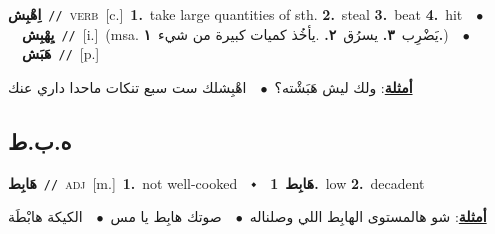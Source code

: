 \documentclass[10pt,a4paper,twoside]{article} %
\begin{document}
\begin{multicols}{2}
{{{{\setlength\topsep{0pt}\textbf{\foreignlanguage{arabic}{اِهْبِش}}\ {\color{gray}\texttt{//}\color{black}}\ \textsc{verb}\ [c.]\ \textbf{1.}~take large quantities of sth.  \textbf{2.}~steal  \textbf{3.}~beat  \textbf{4.}~hit\ \ $\bullet$\ \ \setlength\topsep{0pt}\textbf{\foreignlanguage{arabic}{يِهْبِش}}\ {\color{gray}\texttt{//}\color{black}}\ [i.]\ \color{gray}(msa. \foreignlanguage{arabic}{يَضْرِب}~\foreignlanguage{arabic}{\textbf{٣.}}  \foreignlanguage{arabic}{يسرُق}~\foreignlanguage{arabic}{\textbf{٢.}}  .\foreignlanguage{arabic}{يأخُذ كميات كبيرة من شيء}~\foreignlanguage{arabic}{\textbf{١.}})\color{black}\ \ $\bullet$\ \ \setlength\topsep{0pt}\textbf{\foreignlanguage{arabic}{هَبَش}}\ {\color{gray}\texttt{//}\color{black}}\ [p.]\  \begin{flushright}\color{gray}\foreignlanguage{arabic}{\textbf{\underline{\foreignlanguage{arabic}{أمثلة}}}: ولك ليش هَبَشْته؟\ $\bullet$\ \  اهْبِشلك ست سبع تنكات ماحدا داري عنك}\end{flushright}\color{black}} \vspace{2mm}

\vspace{-3mm}
\subsection*{\color{blue}\foreignlanguage{arabic}{ه.ب.ط}\color{blue}{}} 

{\setlength\topsep{0pt}\textbf{\foreignlanguage{arabic}{هَابِط}}\ {\color{gray}\texttt{//}\color{black}}\ \textsc{adj}\ [m.]\ \textbf{1.}~not well-cooked\ \ $\smblkdiamond$\ \ \setlength\topsep{0pt}\textbf{\foreignlanguage{arabic}{هَابِط}}\ \textbf{1.}~low  \textbf{2.}~decadent\  \begin{flushright}\color{gray}\foreignlanguage{arabic}{\textbf{\underline{\foreignlanguage{arabic}{أمثلة}}}: شو هالمستوى الهابِط اللي وصلناله\ $\bullet$\ \  صوتك هابِط يا مس\ $\bullet$\ \  الكيكة هابْطَة}\end{flushright}\color{black}} \vspace{2mm}

}}}
\end{multicols}
\end{document}
